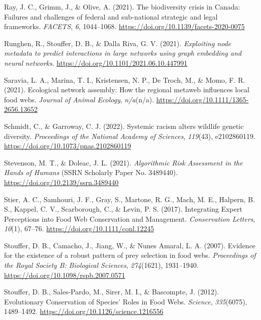 \documentclass[11pt]{article}
\newlength{\cslhangindent}
\newenvironment{CSLReferences}[2] %
 {%
  \setlength{\parindent}{0pt}
  \ifodd #1 \everypar{\setlength{\hangindent}{\cslhangindent}}\ignorespaces\fi
  \ifnum #2 > 0
  \setlength{\parskip}{#2\baselineskip}
  \fi
 }%
 {}
\begin{document}
\begin{CSLReferences}{1}{0}
\leavevmode{}%
Ray, J. C., Grimm, J., \& Olive, A. (2021). The biodiversity crisis in
Canada: Failures and challenges of federal and sub-national strategic
and legal frameworks. \emph{FACETS}, \emph{6}, 1044--1068.
\url{https://doi.org/10.1139/facets-2020-0075}

\leavevmode{}%
Runghen, R., Stouffer, D. B., \& Dalla Riva, G. V. (2021).
\emph{Exploiting node metadata to predict interactions in large networks
using graph embedding and neural networks}.
\url{https://doi.org/10.1101/2021.06.10.447991}

\leavevmode{}%
Saravia, L. A., Marina, T. I., Kristensen, N. P., De Troch, M., \& Momo,
F. R. (2021). Ecological network assembly: How the regional metaweb
influences local food webs. \emph{Journal of Animal Ecology},
\emph{n/a}(n/a). \url{https://doi.org/10.1111/1365-2656.13652}

\leavevmode{}%
Schmidt, C., \& Garroway, C. J. (2022). Systemic racism alters wildlife
genetic diversity. \emph{Proceedings of the National Academy of
Sciences}, \emph{119}(43), e2102860119.
\url{https://doi.org/10.1073/pnas.2102860119}

\leavevmode{}%
Stevenson, M. T., \& Doleac, J. L. (2021). \emph{Algorithmic Risk
Assessment in the Hands of Humans} (SSRN Scholarly Paper No. 3489440).
\url{https://doi.org/10.2139/ssrn.3489440}

\leavevmode{}%
Stier, A. C., Samhouri, J. F., Gray, S., Martone, R. G., Mach, M. E.,
Halpern, B. S., Kappel, C. V., Scarborough, C., \& Levin, P. S. (2017).
Integrating Expert Perceptions into Food Web Conservation and
Management. \emph{Conservation Letters}, \emph{10}(1), 67--76.
\url{https://doi.org/10.1111/conl.12245}

\leavevmode{}%
Stouffer, D. B., Camacho, J., Jiang, W., \& Nunes Amaral, L. A. (2007).
Evidence for the existence of a robust pattern of prey selection in food
webs. \emph{Proceedings of the Royal Society B: Biological Sciences},
\emph{274}(1621), 1931--1940.
\url{https://doi.org/10.1098/rspb.2007.0571}

\leavevmode{}%
Stouffer, D. B., Sales-Pardo, M., Sirer, M. I., \& Bascompte, J. (2012).
Evolutionary Conservation of Species' Roles in Food Webs.
\emph{Science}, \emph{335}(6075), 1489--1492.
\url{https://doi.org/10.1126/science.1216556}


\end{CSLReferences}
\end{document}
